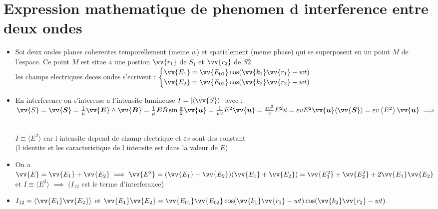 \documentclass[12pt]{book}
\begin{document}
        \section{Expression mathematique de phenomen d interference entre deux ondes}
            \begin{itemize}
                \item Soi deux ondes planes coherentes temporellement (meme $w$) et spatialement (meme phase) qui se superposent en un point $M$ de l'espace. Ce point $M$ est situe a une postion $ \vv{r_1}$ de $S_1$ et $\vv{r_2}$ de $S2$ \\
                    les champs electriques deces ondes s'ecrivent : $\begin{cases}
                        \vv{E_1} = \vv{E_{01}}\cos(\vv{k_1}\vv{r_1}-wt)\\
                        \vv{E_2} = \vv{E_{02}}\cos(\vv{k_2}\vv{r_2}-wt)
                    \end{cases}$  \\
                \item En interference on s'interesse a l'intensite lumineuse $I = | \langle \vv{S}\rangle |$ avec :
                    $\vv{S} =\vv{\boldsymbol{S}}=\frac{1}{\mu} \vv{\boldsymbol{E}} \wedge \vv{\boldsymbol{B}}=\frac{1}{\mu} \boldsymbol{E} B \sin \frac{\pi}{2} \vv{\boldsymbol{u}}=\frac{1}{\mu v} E^{2} \vv{\boldsymbol{u}}=\frac{\varepsilon v^{2}}{v} E^{2} \vec{u}=\varepsilon v E^{2} \vv{\boldsymbol{u}}\langle\vv{\boldsymbol{S}}\rangle=\varepsilon v\left\langle E^{2}\right\rangle \vv{\boldsymbol{u}} \implies$
                    \begin{center}
                        \\
                        $ I \equiv \langle E^2 \rangle$ car l intensite depend de champ electrique et $\varepsilon v$ sont des constant \\ (l identite et les caracteristique de l intensite est dans la valeur de $E$)  
                    \end{center} 
                \item On a $\vv{E} =\vv{E_1} + \vv{E_2} \implies \vv{E^2}=(\vv{E_1}+\vv{E_2})(\vv{E_1}+\vv{E_2})=\vv{E_1^2}+\vv{E_2^2}+2\vv{E_1}\vv{E_2}$\\
                    et $ I \equiv \langle E^2 \rangle$ $\implies $ ($I_{12}$ est le terme d'interferance)
                \item $I_{12} = \langle \vv{E_1}\vv{E_2} \rangle $ et $ \vv{E_1}\vv{E_2} =\vv{E_{01}}\vv{E_{02}}\cos(\vv{k_1}\vv{r_1}-wt)\cos(\vv{k_2}\vv{r_2}-wt)$\\

\end{itemize}
\end{document}
